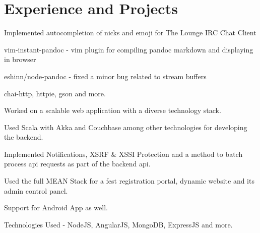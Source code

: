 \documentclass[]{deedy-resume-openfont}
\begin{document}
\begin{minipage}[t]{0.66\textwidth} 


\section{Experience and Projects}

\descript{}
\vspace{\topsep}
\begin{tightemize}
  \item Implemented autocompletion of nicks and emoji for The Lounge IRC Chat
    Client
  \item vim-instant-pandoc - vim plugin for compiling pandoc markdown and
    displaying in browser
  \item eshinn/node-pandoc - fixed a minor bug related to stream buffers
  \item chai-http, httpie, gson and more. 
\end{tightemize}

\begin{tightemize}
  \item Worked on a scalable web application with a diverse technology stack.
  \item Used Scala with Akka and Couchbase among other technologies for
    developing the backend.
  \item	Implemented Notifications, XSRF \& XSSI Protection and a method
    to batch process api requests as part of the backend api.
\end{tightemize}

\begin{tightemize}
  \item Used the full MEAN Stack for a fest registration portal, dynamic website
    and its admin control panel.
  \item Support for Android App as well.
  \item Technologies Used - NodeJS, AngularJS, MongoDB, ExpressJS and more.
\end{tightemize}


\end{minipage}
\end{document}
